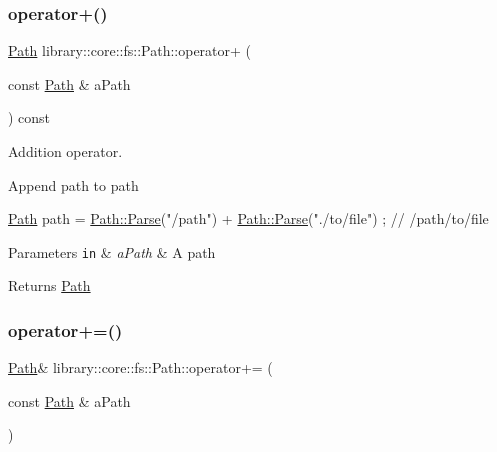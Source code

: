 \subsubsection{\texorpdfstring{operator+()}{operator+()}}
{\footnotesize\ttfamily \hyperlink{classlibrary_1_1core_1_1fs_1_1Path}{Path} library\+::core\+::fs\+::\+Path\+::operator+ (\begin{DoxyParamCaption}\item[{const \hyperlink{classlibrary_1_1core_1_1fs_1_1Path}{Path} \&}]{a\+Path }\end{DoxyParamCaption}) const}



Addition operator. 

Append path to path


\begin{DoxyCode}
\hyperlink{classlibrary_1_1core_1_1fs_1_1Path_aaba9a8e0153813f08f78f1c3275734a4}{Path} path = \hyperlink{classlibrary_1_1core_1_1fs_1_1Path_aebf5bd3af83e0b7376616e146f3e55df}{Path::Parse}(\textcolor{stringliteral}{"/path"}) + \hyperlink{classlibrary_1_1core_1_1fs_1_1Path_aebf5bd3af83e0b7376616e146f3e55df}{Path::Parse}(\textcolor{stringliteral}{"./to/file"}) ; \textcolor{comment}{// /path/to/file}
\end{DoxyCode}



\begin{DoxyParams}[1]{Parameters}
\mbox{\tt in}  & {\em a\+Path} & A path \\
\hline
\end{DoxyParams}
\begin{DoxyReturn}{Returns}
\hyperlink{classlibrary_1_1core_1_1fs_1_1Path}{Path} 
\end{DoxyReturn}
\mbox{\label{classlibrary_1_1core_1_1fs_1_1Path_a3fae713dbf257fdcec2fdb2ec6c27256}} 
\subsubsection{\texorpdfstring{operator+=()}{operator+=()}}
{\footnotesize\ttfamily \hyperlink{classlibrary_1_1core_1_1fs_1_1Path}{Path}\& library\+::core\+::fs\+::\+Path\+::operator+= (\begin{DoxyParamCaption}\item[{const \hyperlink{classlibrary_1_1core_1_1fs_1_1Path}{Path} \&}]{a\+Path }\end{DoxyParamCaption})}



